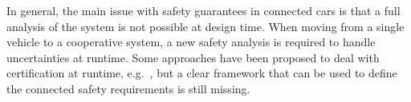 



In general, the main issue with safety guarantees in connected cars is that a full analysis of the system is not possible at design time. When moving from a single vehicle to a cooperative system, a new safety analysis is required to handle uncertainties at runtime. Some approaches have been proposed to deal with certification at runtime, e.g.~\cite{runtime1, runtime3}, but a clear framework that can be used to define the connected safety requirements is still missing.



